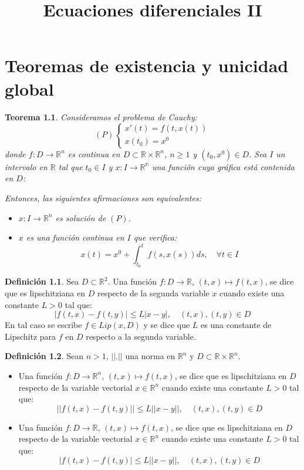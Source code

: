 \documentclass{report}
\title{Ecuaciones diferenciales II}
\author{}
\newtheorem{theorem}{Teorema}[chapter]
\theoremstyle{remark}
\theoremstyle{remark}
\theoremstyle{remark}
\theoremstyle{definition}
\newtheorem{definition}{Definición}[chapter]
\theoremstyle{definition}
\theoremstyle{definition}
\begin{document}
\maketitle
\tableofcontents

\chapter{Teoremas de existencia y unicidad global}
\begin{theorem}
    Consideramos el problema de Cauchy:
    $$(P) \begin{cases}
            x'(t) = f(t, x(t)) \\
            x(t_0) = x^0
        \end{cases}$$
    donde $f: D \to \mathbb{R}^n$ es continua en $D \subset \mathbb{R} \times \mathbb{R}^n$, $n \geq 1$ y $(t_0, x^0) \in D$.
    Sea $I$ un intervalo en $\mathbb{R}$ tal que $t_0 \in I$ y $x: I \to \mathbb{R^n}$ una función cuya gráfica está contenida en $D$:

    Entonces, las siguientes afirmaciones son equivalentes:
    \begin{itemize}
        \item $x: I \to \mathbb{R}^n$ es solución de $(P)$.
        \item $x$ es una función continua en $I$ que verifica:
              $$x(t) = x^0 + \int_{t_0}^t f(s, x(s))ds, \quad \forall t \in I$$
    \end{itemize}
\end{theorem}

\begin{definition}
    Sea $D \subset \mathbb{R}^2$.
    Una función $f: D \to \mathbb{R}$, $(t, x) \mapsto f(t, x)$, se dice que es lipschitziana en $D$ respecto de la segunda variable $x$ cuando existe una constante $L > 0$ tal que:
    $$|f(t, x) - f(t, y)| \leq L|x-y|, \quad (t, x), (t, y) \in D$$
    En tal caso se escribe $f \in Lip(x, D)$ y se dice que $L$ es una constante de Lipschitz para $f$ en $D$ respecto a la segunda variable.
\end{definition}

\begin{definition}
    Sean $n > 1$, $||.||$ una norma en $\mathbb{R}^n$ y $D \subset \mathbb{R} \times \mathbb{R}^n$.
    \begin{itemize}
        \item Una función $f: D \to \mathbb{R}^n$, $(t, x) \mapsto f(t, x)$, se dice que es lipschitziana en $D$ respecto de la variable vectorial $x \in \mathbb{R}^n$ cuando existe una constante $L > 0$ tal que:
              $$||f(t, x) - f(t, y)|| \leq L||x-y||, \quad (t, x), (t, y) \in D$$
        \item Una función $f: D \to \mathbb{R}$, $(t, x) \mapsto f(t, x)$, se dice que es lipschitziana en $D$ respecto de la variable vectorial $x \in \mathbb{R}^n$ cuando existe una constante $L > 0$ tal que:
              $$|f(t, x) - f(t, y)| \leq L||x-y||, \quad (t, x), (t, y) \in D$$
    \end{itemize}
\end{definition}
\end{document}

